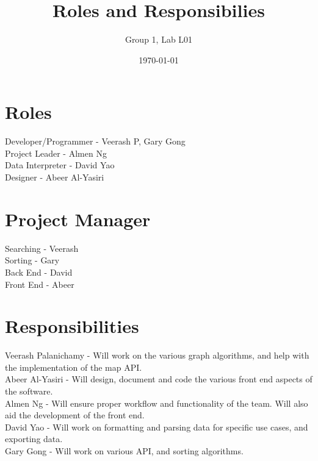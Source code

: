\documentclass[12pt]{article}
\title{Roles and Responsibilies}
\author{Group 1, Lab L01}
\date{\today}
\begin{document}
\maketitle
\section{Roles} 
Developer/Programmer - Veerash P, Gary Gong\\
Project Leader - Almen Ng\\
Data Interpreter - David Yao\\
Designer - Abeer Al-Yasiri\\

\section{Project Manager} 
Searching - Veerash\\
Sorting - Gary\\
Back End - David \\
Front End - Abeer \\

\section{Responsibilities} 

Veerash Palanichamy - Will work on the various graph algorithms, and help with the implementation of the map API.\\
Abeer Al-Yasiri - Will design, document and code the various front end aspects of the software.\\
Almen Ng - Will ensure proper workflow and functionality of the team. Will also aid the development of the front end.\\
David Yao - Will work on formatting and parsing data for specific use cases, and exporting data.\\
Gary Gong - Will work on various API, and sorting algorithms.\\
\end{document}
